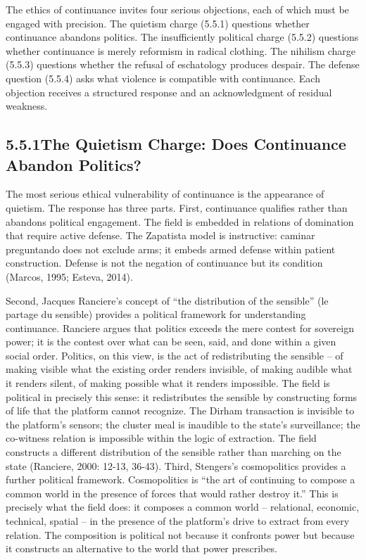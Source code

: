 The ethics of continuance invites four serious objections, each of which must be engaged with precision. The quietism charge (5.5.1) questions whether continuance abandons politics. The insufficiently political charge (5.5.2) questions whether continuance is merely reformism in radical clothing. The nihilism charge (5.5.3) questions whether the refusal of eschatology produces despair. The defense question (5.5.4) asks what violence is compatible with continuance. Each objection receives a structured response and an acknowledgment of residual weakness.

\subsection{5.5.1\quad The Quietism Charge: Does Continuance Abandon Politics?}

The most serious ethical vulnerability of continuance is the appearance of quietism. The response has three parts. First, continuance qualifies rather than abandons political engagement. The field is embedded in relations of domination that require active defense. The Zapatista model is instructive: caminar preguntando does not exclude arms; it embeds armed defense within patient construction. Defense is not the negation of continuance but its condition (Marcos, 1995; Esteva, 2014).

Second, Jacques Ranciere’s concept of “the distribution of the sensible” (le partage du sensible) provides a political framework for understanding continuance. Ranciere argues that politics exceeds the mere contest for sovereign power; it is the contest over what can be seen, said, and done within a given social order. Politics, on this view, is the act of redistributing the sensible – of making visible what the existing order renders invisible, of making audible what it renders silent, of making possible what it renders impossible. The field is political in precisely this sense: it redistributes the sensible by constructing forms of life that the platform cannot recognize. The Dirham transaction is invisible to the platform’s sensors; the cluster meal is inaudible to the state’s surveillance; the co-witness relation is impossible within the logic of extraction. The field constructs a different distribution of the sensible rather than marching on the state (Ranciere, 2000: 12-13, 36-43). Third, Stengers’s cosmopolitics provides a further political framework. Cosmopolitics is “the art of continuing to compose a common world in the presence of forces that would rather destroy it.” This is precisely what the field does: it composes a common world – relational, economic, technical, spatial – in the presence of the platform’s drive to extract from every relation. The composition is political not because it confronts power but because it constructs an alternative to the world that power prescribes.

